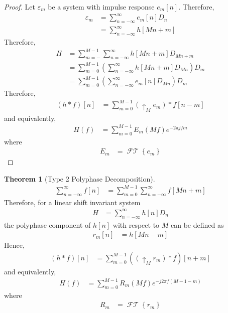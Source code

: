 \documentclass[titlepage, fleqn, a4paper, 12pt, twoside]{article}
\theoremstyle{definition}
\theoremstyle{theorem}
\newtheorem{theorem}{Theorem}
\DeclareMathOperator{\FT}{\mathcal{FT}}
\def\upsample#1{\uparrow_{#1}}
\begin{document}
\begin{proof}
	Let $\varepsilon_m$ be a system with impulse response $e_m[n]$.
	Therefore,
	\begin{align*}
		\varepsilon_m &= \sum\limits_{n = -\infty}^{\infty} e_m[n] D_n\\
		&= \sum\limits_{n = -\infty}^{\infty} h[M n + m]
	\end{align*}
	Therefore,
	\begin{align*}
		H &= \sum\limits_{m = -}^{M - 1} \sum\limits_{n = -\infty}^{\infty} h[M n + m] D_{M n + m}\\
		&= \sum\limits_{m = 0}^{M - 1} \left( \sum\limits_{n = -\infty}^{\infty} h[M n + m] D_{M n} \right) D_m\\
		&= \sum\limits_{m = 0}^{M - 1} \left( \sum\limits_{n = -\infty}^{\infty} e_m[n] D_{M n} \right) D_m
	\end{align*}
	Therefore,
	\begin{align*}
		(h \ast f)[n] &= \sum\limits_{m = 0}^{M - 1} (\upsample{M} e_m) \ast f[n - m]
	\end{align*}
	and equivalently,
	\begin{align*}
		H(f) &= \sum\limits_{m = 0}^{M - 1} E_m(M f) e^{-2 \pi j f m}
	\end{align*}
	where
	\begin{align*}
		E_m &= \FT\left\{ e_m \right\}
	\end{align*}
\end{proof}

\begin{theorem}[Type 2 Polyphase Decomposition]
	\begin{align*}
		\sum\limits_{n = -\infty}^{\infty} f[n] &= \sum\limits_{m = 0}^{M - 1} \sum\limits_{n = -\infty}^{\infty} f[M n + m]
	\end{align*}
	Therefore, for a linear shift invariant system
	\begin{align*}
		H &= \sum\limits_{n = -\infty}^{\infty} h[n] D_n
	\end{align*}
	the polyphase component of $h[n]$ with respect to $M$ can be defined as
	\begin{align*}
		r_m[n] &= h[M n - m]
	\end{align*}
	Hence,
	\begin{align*}
		(h \ast f)[n] &= \sum\limits_{m = 0}^{M - 1} \left( \left( \upsample{M} r_m \right) \ast f \right) [n + m]
	\end{align*}
	and equivalently,
	\begin{align*}
		H(f) &= \sum\limits_{m = 0}^{M - 1} R_m(M f) e^{-j 2 \pi f (M - 1 - m)}
	\end{align*}
	where
	\begin{align*}
		R_m &= \FT\left\{ r_m \right\}
	\end{align*}
	\label{thm:type_2_polyphase_decomposition}
\end{theorem}
\end{document}
